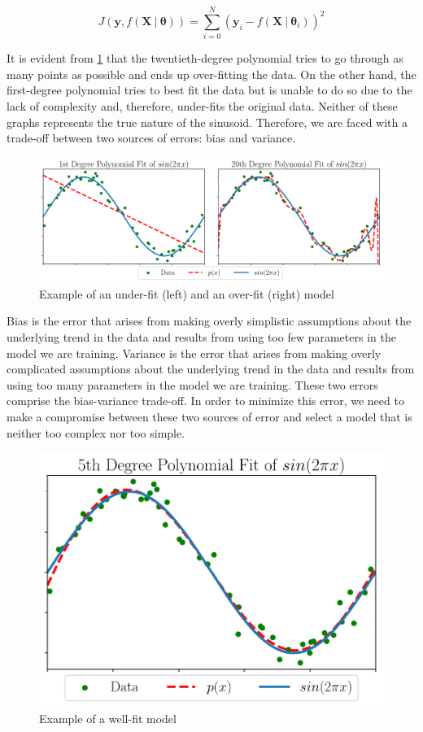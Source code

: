 \begin{equation}
	\label{eq:leastsquares}
	J(\mathbf{y}, f(\mathbf{X} \ | \ \boldsymbol{\theta})) = \sum_{i=0}^{N} (\mathbf{y}_i  - f(\mathbf{X} \ | \ \boldsymbol{\theta}_i))^2
\end{equation}


It is evident from \cref{fig:overfit} that the twentieth-degree polynomial tries to go through as many points as possible and ends up over-fitting the data. On the other hand, the first-degree polynomial tries to best fit the data but is unable to do so due to the lack of complexity and, therefore, under-fits the original data. Neither of these graphs represents the true nature of the sinusoid. Therefore, we are faced with a trade-off between two sources of errors: bias and variance. 

\begin{figure}[!ht]
	\centering
	\includegraphics[width=\linewidth]{pictures/poly_fit.pdf}
	\caption[Example of an under-fit and an over-fit model]{Example of an under-fit (left) and an over-fit (right) model}\label{fig:overfit}  
\end{figure}

Bias is the error that arises from making overly simplistic assumptions about the underlying trend in the data and results from using too few parameters in the model we are training. Variance is the error that arises from making overly complicated assumptions about the underlying trend in the data and results from using too many parameters in the model we are training. These two errors comprise the bias-variance trade-off. In order to minimize this error, we need to make a compromise between these two sources of error and select a model that is neither too complex nor too simple.

\begin{figure}[!ht]
	\centering
	\includegraphics[width=0.5\linewidth]{pictures/poly_fit_correct.pdf}
	\caption{Example of a well-fit model}\label{fig:wellfit}  
\end{figure}


